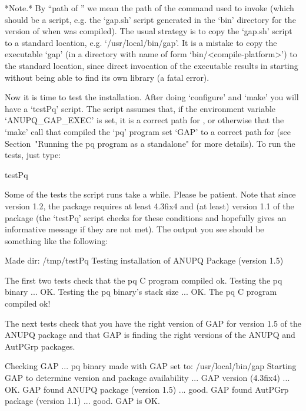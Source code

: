 *Note.* By ``path of {\GAP}'' we mean the path of  the  command  used  to
invoke {\GAP} (which  should  be  a  script,  e.g.  the  `gap.sh'  script
generated in the `bin' directory for the version of  {\GAP}  when  {\GAP}
was compiled). The usual strategy is to copy the  `gap.sh'  script  to  a
standard location, e.g. `/usr/local/bin/gap'. It is a mistake to copy the
{\GAP}  executable  `gap'   (in   a   directory   with   name   of   form
`bin/<compile-platform>')  to  the  standard   location,   since   direct
invocation of the executable results in  {\GAP}  starting  without  being
able to find its own library (a fatal error).


Now it is time to test the  installation.  After  doing  `configure'  and
`make' you will have a `testPq' script. The script assumes that,  if  the
environment variable `ANUPQ_GAP_EXEC' is set, it is a  correct  path  for
{\GAP}, or otherwise that the `make' call that compiled the  `pq' program
set `GAP' to a correct path  for  {\GAP}  (see  Section~"Running  the  pq
program as a standalone" for more details). To run the tests, just type:

\begintt
testPq
\endtt

Some of the tests the script runs take a while. Please be  patient.  Note
that since version 1.2, the {\ANUPQ} package  requires  at  least  {\GAP}
4.3fix4 and (at  least)  version  1.1  of  the  {\AutPGrp}  package  (the
`testPq' script checks  for  these  conditions  and  hopefully  gives  an
informative message if they are not met). The output you  see  should  be
something like the following:

\begintt
Made dir: /tmp/testPq
Testing installation of ANUPQ Package (version 1.5)

The first two tests check that the pq C program compiled ok.
Testing the pq binary ... OK.
Testing the pq binary's stack size ... OK.
The pq C program compiled ok!

The next tests check that you have the right version of GAP
for version 1.5 of the ANUPQ package and that GAP is finding
the right versions of the ANUPQ and AutPGrp packages.

Checking GAP ...
 pq binary made with GAP set to: /usr/local/bin/gap
 Starting GAP to determine version and package availability ...
  GAP version (4.3fix4) ... OK.
  GAP found ANUPQ package (version 1.5) ... good.
  GAP found AutPGrp package (version 1.1) ... good.
 GAP is OK.

